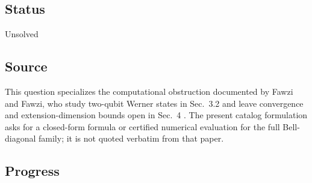 \subsection*{Status}

Unsolved

\subsection*{Source}

This question specializes the computational obstruction documented by
Fawzi and Fawzi, who study two-qubit Werner states in Sec.~3.2 and leave
convergence and extension-dimension bounds open in Sec.~4
.  The present catalog formulation
asks for a closed-form formula or certified numerical evaluation for the
full Bell-diagonal family; it is not quoted verbatim from that paper.

\subsection*{Progress}

